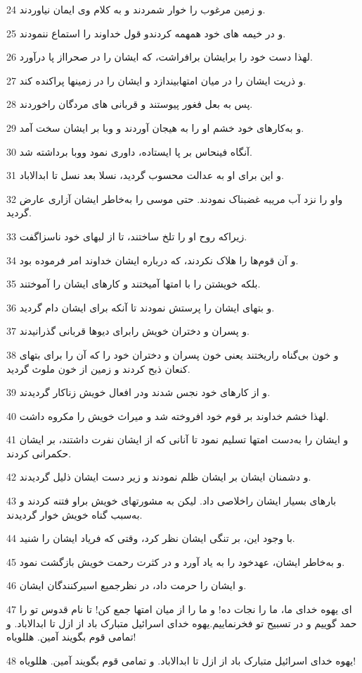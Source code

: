\par 24 و زمین مرغوب را خوار شمردند و به کلام وی ایمان نیاوردند.
\par 25 و در خیمه های خود همهمه کردندو قول خداوند را استماع ننمودند.
\par 26 لهذا دست خود را برایشان برافراشت، که ایشان را در صحرااز پا درآورد.
\par 27 و ذریت ایشان را در میان امتهابیندازد و ایشان را در زمینها پراکنده کند.
\par 28 پس به بعل فغور پیوستند و قربانی های مردگان راخوردند.
\par 29 و به‌کارهای خود خشم او را به هیجان آوردند و وبا بر ایشان سخت آمد.
\par 30 آنگاه فینحاس بر پا ایستاده، داوری نمود ووبا برداشته شد.
\par 31 و این برای او به عدالت محسوب گردید، نسلا بعد نسل تا ابدالاباد.
\par 32 واو را نزد آب مریبه غضبناک نمودند. حتی موسی را به‌خاطر ایشان آزاری عارض گردید.
\par 33 زیراکه روح او را تلخ ساختند، تا از لبهای خود ناسزاگفت.
\par 34 و آن قوم‌ها را هلاک نکردند، که درباره ایشان خداوند امر فرموده بود.
\par 35 بلکه خویشتن را با امتها آمیختند و کارهای ایشان را آموختند.
\par 36 و بتهای ایشان را پرستش نمودند تا آنکه برای ایشان دام گردید.
\par 37 و پسران و دختران خویش رابرای دیوها قربانی گذرانیدند.
\par 38 و خون بی‌گناه راریختند یعنی خون پسران و دختران خود را که آن را برای بتهای کنعان ذبح کردند و زمین از خون ملوث گردید.
\par 39 و از کارهای خود نجس شدند ودر افعال خویش زناکار گردیدند.
\par 40 لهذا خشم خداوند بر قوم خود افروخته شد و میراث خویش را مکروه داشت.
\par 41 و ایشان را به‌دست امتها تسلیم نمود تا آنانی که از ایشان نفرت داشتند، بر ایشان حکمرانی کردند.
\par 42 و دشمنان ایشان بر ایشان ظلم نمودند و زیر دست ایشان ذلیل گردیدند.
\par 43 بارهای بسیار ایشان راخلاصی داد. لیکن به مشورتهای خویش براو فتنه کردند و به‌سبب گناه خویش خوار گردیدند.
\par 44 با وجود این، بر تنگی ایشان نظر کرد، وقتی که فریاد ایشان را شنید.
\par 45 و به‌خاطر ایشان، عهدخود را به یاد آورد و در کثرت رحمت خویش بازگشت نمود.
\par 46 و ایشان را حرمت داد، در نظرجمیع اسیرکنندگان ایشان.
\par 47 ‌ای یهوه خدای ما، ما را نجات ده! و ما را از میان امتها جمع کن! تا نام قدوس تو را حمد گوییم و در تسبیح تو فخرنماییم.یهوه خدای اسرائیل متبارک باد از ازل تا ابدالاباد. و تمامی قوم بگویند آمین. هللویاه!
\par 48 یهوه خدای اسرائیل متبارک باد از ازل تا ابدالاباد. و تمامی قوم بگویند آمین. هللویاه!
 

